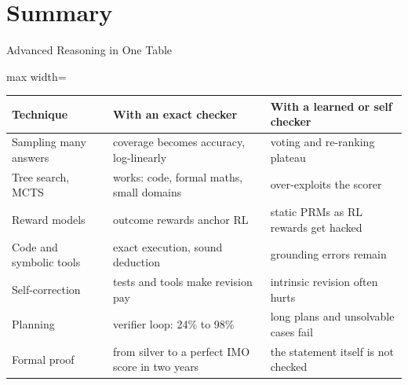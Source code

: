 \section{Summary}

\begin{frame}{Advanced Reasoning in One Table}
    \begin{center}
    \footnotesize
    \renewcommand{\arraystretch}{1.15}
    \begin{adjustbox}{max width=\linewidth}\begin{tabular}{>{\raggedright\arraybackslash}p{3.0cm}>{\raggedright\arraybackslash}p{5.3cm}>{\raggedright\arraybackslash}p{5.3cm}}
        \toprule
        \textbf{Technique} & \textbf{With an exact checker} & \textbf{With a learned or self checker} \\
        \midrule
        Sampling many answers & coverage becomes accuracy, log-linearly & voting and re-ranking plateau \\
        Tree search, MCTS & works: code, formal maths, small domains & over-exploits the scorer \\
        Reward models & outcome rewards anchor RL & static PRMs as RL rewards get hacked \\
        Code and symbolic tools & exact execution, sound deduction & grounding errors remain \\
        Self-correction & tests and tools make revision pay & intrinsic revision often hurts \\
        Planning & verifier loop: 24\% to 98\% & long plans and unsolvable cases fail \\
        Formal proof & from silver to a perfect IMO score in two years & the statement itself is not checked \\
        \bottomrule
    \end{tabular}\end{adjustbox}
    \end{center}
    \vspace{0.13em}
\end{frame}

